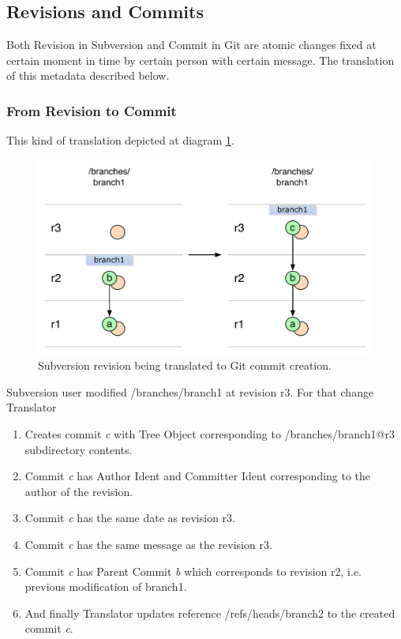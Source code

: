 \subsection{Revisions and Commits}

Both Revision in Subversion and Commit in Git are atomic changes fixed at certain moment in time by certain person with certain message. The translation of this metadata described below.

\subsubsection{From Revision to Commit}

This kind of translation depicted at diagram \ref{single_change_svn_to_git}.

\begin{figure}[!h]
\centering
\includegraphics[width=\linewidth]{img/diagrams/single_change_svn_to_git.pdf}
\caption{Subversion revision being translated to Git commit creation.}
\label{single_change_svn_to_git}
\end{figure}

Subversion user modified /branches/branch1 at revision r3. For that change Translator
\begin{enumerate}
	\item Creates commit \emph{c} with Tree Object corresponding to /branches/branch1@r3 subdirectory contents.
	\item Commit \emph{c} has Author Ident and Committer Ident corresponding to the author of the revision.
	\item Commit \emph{c} has the same date as revision r3.
	\item Commit \emph{c} has the same message as the revision r3.
	\item Commit \emph{c} has Parent Commit \emph{b} which corresponds to revision r2, i.e. previous modification of branch1.
	\item And finally Translator updates reference /refs/heads/branch2 to the created commit \emph{c}.
\end{enumerate}

